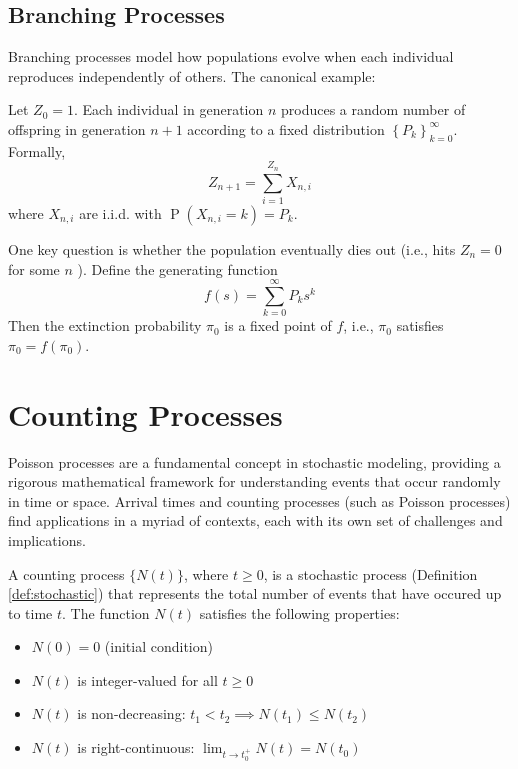 \documentclass[10pt, headings=standardclasses, parskip=half, twoside]{scrartcl}
\newcommand{\Prob}{\operatorname{P}}
\begin{document}
\subsection{Branching Processes}\label{subsec:branching}
Branching processes model how populations evolve when each individual reproduces independently of others. The canonical example:
\begin{definition}\label{def:GW}
Let $Z_0=1$. Each individual in generation $n$ produces a random number of offspring in generation $n+1$ according to a fixed distribution $\left\{P_k\right\}_{k=0}^{\infty}$. Formally,
$$
Z_{n+1}=\sum_{i=1}^{Z_n} X_{n, i}
$$
where $X_{n, i}$ are i.i.d. with $\Prob(X_{n, i}=k)=P_k$.
\end{definition}
One key question is whether the population eventually dies out (i.e., hits $Z_n=0$ for some $n$ ). 
Define the generating function
$$
f(s)=\sum_{k=0}^{\infty} P_k s^k
$$
Then the extinction probability $\pi_0$ is a fixed point of $f$, i.e., $\pi_0$ satisfies $\pi_0=f(\pi_0)$.


\clearpage
\section{Counting Processes}\label{sec:counting}
Poisson processes are a fundamental concept in stochastic modeling, providing a rigorous mathematical framework for understanding events that occur randomly in time or space. 
Arrival times and counting processes (such as Poisson processes) find applications in a myriad of contexts, each with its own set of challenges and implications.

\begin{definition}\label{def:counting}
  A counting process \(\{N(t)\}\), where \(t \ge 0\), is a stochastic process (Definition \ref{def:stochastic}) that represents the total number of events that have occured up to time \(t\).
  The function \(N(t)\) satisfies the following properties:
  \begin{itemize}[before={\parskip = 0em}, nosep]
    \item \(N(0) = 0\) (initial condition)
    \item \(N(t)\) is integer-valued for all \(t \ge 0\)
    \item \(N(t)\) is non-decreasing: \(t_1 < t_2 \implies N(t_1) \leq N(t_2)\)
    \item \(N(t)\) is right-continuous: \(\lim_{t \to t_0^+} N(t) = N(t_0)\) \qedhere
  \end{itemize}
\end{definition}
\end{document}
